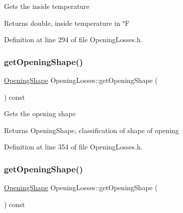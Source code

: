 Gets the inside temperature

\begin{DoxyReturn}{Returns}
double, inside temperature in °F 
\end{DoxyReturn}


Definition at line 294 of file Opening\+Losses.\+h.

\mbox{\label{class_opening_losses_a5046cd699178e4edca774d0d0da7965a}} 
\subsubsection{\texorpdfstring{get\+Opening\+Shape()}{getOpeningShape()}\hspace{0.1cm}{\footnotesize\ttfamily [1/3]}}
{\footnotesize\ttfamily \hyperlink{class_opening_losses_a57f9759b6fd72a1b75aa885800e26157}{Opening\+Shape} Opening\+Losses\+::get\+Opening\+Shape (\begin{DoxyParamCaption}{ }\end{DoxyParamCaption}) const\hspace{0.3cm}{\ttfamily [inline]}}

Gets the opening shape

\begin{DoxyReturn}{Returns}
Opening\+Shape, classification of shape of opening 
\end{DoxyReturn}


Definition at line 354 of file Opening\+Losses.\+h.

\mbox{\label{class_opening_losses_a5046cd699178e4edca774d0d0da7965a}} 
\subsubsection{\texorpdfstring{get\+Opening\+Shape()}{getOpeningShape()}\hspace{0.1cm}{\footnotesize\ttfamily [2/3]}}
{\footnotesize\ttfamily \hyperlink{class_opening_losses_a57f9759b6fd72a1b75aa885800e26157}{Opening\+Shape} Opening\+Losses\+::get\+Opening\+Shape (\begin{DoxyParamCaption}{ }\end{DoxyParamCaption}) const\hspace{0.3cm}{\ttfamily [inline]}}

